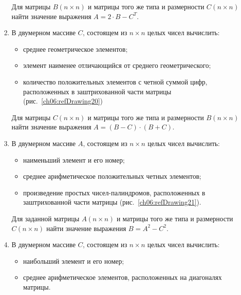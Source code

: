 \begin{enumerate}
Для матрицы $B(n\times n)$ и матрицы того же типа и размерности $C(n\times n)$
найти значение выражения  $A=2\cdot B-C^T$.
\item В двумерном массиве $C$, состоящем из $n\times n$ целых чисел вычислить:

\begin{itemize}
\item среднее геометрическое элементов;
\item элемент наименее отличающийся от среднего геометрического;
\item количество положительных элементов с четной суммой цифр, расположенных в заштрихованной 
части матрицы (рис.~\ref{ch06:refDrawing20})
\end{itemize}
Для матрицы $C(n\times n)$ и матрицы того же типа и размерности $B(n\times n)$
найти значение выражения  $A=(B-C)\cdot (B+C)$.


\item В двумерном массиве $A$, состоящем из $n\times n$ целых чисел вычислить:

\begin{itemize}
\item наименьший элемент и его номер;
\item среднее арифметическое положительных четных элементов;
\item произведение простых чисел-палиндромов, расположенных в заштрихованной 
части матрицы (рис.~\ref{ch06:refDrawing21}).
\end{itemize}

Для заданной матрицы $A(n\times n)$ и матрицы того же типа и размерности
$C(n\times n)$ найти значение выражения  $B=A^2-C^2$.



\item В двумерном массиве $C$, состоящем из $n\times n$ целых чисел вычислить:

\begin{itemize}
\item наибольший элемент и его номер;
\item среднее арифметическое элементов, расположенных на диагоналях матрицы.
\end{itemize}


\end{enumerate}
